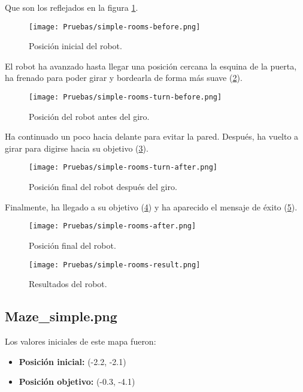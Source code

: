 \documentclass[a4paper, 11pt]{article}
\begin{document}
		Que son los reflejados en la figura \ref{begin-sr}.
		
		\begin{figure}[H]
			\centering
			\texttt{[image: Pruebas/simple-rooms-before.png]}
			\caption{Posición inicial del robot.}
			\label{begin-sr}	
		\end{figure}
		
		El robot ha avanzado hasta llegar una posición cercana la esquina de la puerta, ha frenado para
		poder girar y bordearla de forma más suave (\ref{turn-b-sr}).
		
		\begin{figure}[H]
			\centering
			\texttt{[image: Pruebas/simple-rooms-turn-before.png]}
			\caption{Posición del robot antes del giro.}
			\label{turn-b-sr}	
		\end{figure}
		
		Ha continuado un poco hacia delante para evitar la pared. Después, ha vuelto a girar para digirse
		hacia su objetivo (\ref{turn-a-sr}).
		
		\begin{figure}[H]
			\centering
			\texttt{[image: Pruebas/simple-rooms-turn-after.png]}
			\caption{Posición final del robot después del giro.}
			\label{turn-a-sr}	
		\end{figure}
		
		Finalmente, ha llegado a su objetivo (\ref{end-sr}) y ha aparecido el mensaje de éxito (\ref{res-sr}).

		\begin{figure}[H]
			\centering
			\texttt{[image: Pruebas/simple-rooms-after.png]}
			\caption{Posición final del robot.}
			\label{end-sr}	
		\end{figure}

		\begin{figure}[H]
			\centering
			\texttt{[image: Pruebas/simple-rooms-result.png]}
			\caption{Resultados del robot.}
			\label{res-sr}	
		\end{figure}
	

	\subsection{Maze\_simple.png}
		Los valores iniciales de este mapa fueron:
		
		\begin{itemize}
			\item \textbf{Posición inicial:} (-2.2, -2.1)
			\item \textbf{Posición objetivo:} (-0.3, -4.1)
		\end{itemize}
		
\end{document}
